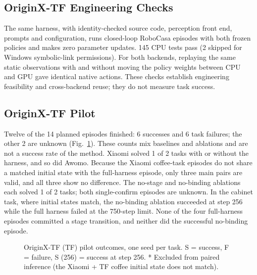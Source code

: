 \documentclass[conference]{IEEEtran}
\begin{document}
\subsection{OriginX-TF Engineering Checks}
The same harness, with identity-checked source code, perception front end, prompts and configuration, runs closed-loop RoboCasa episodes with both frozen policies and makes zero parameter updates. 145 CPU tests pass (2 skipped for Windows symbolic-link permissions). For both backends, replaying the same static observations with and without moving the policy weights between CPU and GPU gave identical native actions. These checks establish engineering feasibility and cross-backend reuse; they do not measure task success.

\subsection{OriginX-TF Pilot}
Twelve of the 14 planned episodes finished: 6 successes and 6 task failures; the other 2 are unknown (Fig.~\ref{fig:pilot}). These counts mix baselines and ablations and are not a success rate of the method. Xiaomi solved 1 of 2 tasks with or without the harness, and so did Awomo. Because the Xiaomi coffee-task episodes do not share a matched initial state with the full-harness episode, only three main pairs are valid, and all three show no difference. The no-stage and no-binding ablations each solved 1 of 2 tasks; both single-confirm episodes are unknown. In the cabinet task, where initial states match, the no-binding ablation succeeded at step 256 while the full harness failed at the 750-step limit. None of the four full-harness episodes committed a stage transition, and neither did the successful no-binding episode.

\begin{figure}[t]
\centering
{}
\caption{OriginX-TF (TF) pilot outcomes, one seed per task. S = success, F = failure, S (256) = success at step 256. * Excluded from paired inference (the Xiaomi + TF coffee initial state does not match).}
\label{fig:pilot}
\end{figure}
\end{document}
